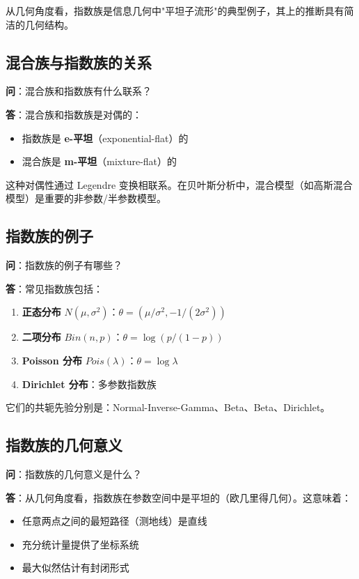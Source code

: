 从几何角度看，指数族是信息几何中"平坦子流形"的典型例子，其上的推断具有简洁的几何结构。

\subsection{混合族与指数族的关系}\label{sec:qa-mixture-vs-exponential}

\textbf{问}：混合族和指数族有什么联系？

\textbf{答}：混合族和指数族是对偶的：

\begin{itemize}
    \item 指数族是 \textbf{e-平坦}（exponential-flat）的
    \item 混合族是 \textbf{m-平坦}（mixture-flat）的
\end{itemize}

这种对偶性通过 Legendre 变换相联系。在贝叶斯分析中，混合模型（如高斯混合模型）是重要的非参数/半参数模型。

\subsection{指数族的例子}\label{sec:qa-exponential-family-examples}

\textbf{问}：指数族的例子有哪些？

\textbf{答}：常见指数族包括：

\begin{enumerate}
    \item \textbf{正态分布} $N(\mu, \sigma^2)$：$\theta = (\mu/\sigma^2, -1/(2\sigma^2))$
    \item \textbf{二项分布} $Bin(n, p)$：$\theta = \log(p/(1-p))$
    \item \textbf{Poisson 分布} $Pois(\lambda)$：$\theta = \log \lambda$
    \item \textbf{Dirichlet 分布}：多参数指数族
\end{enumerate}

它们的共轭先验分别是：Normal-Inverse-Gamma、Beta、Beta、Dirichlet。

\subsection{指数族的几何意义}\label{sec:qa-exponential-family-geometry}

\textbf{问}：指数族的几何意义是什么？

\textbf{答}：从几何角度看，指数族在参数空间中是平坦的（欧几里得几何）。这意味着：
\begin{itemize}
    \item 任意两点之间的最短路径（测地线）是直线
    \item 充分统计量提供了坐标系统
    \item 最大似然估计有封闭形式
\end{itemize}

